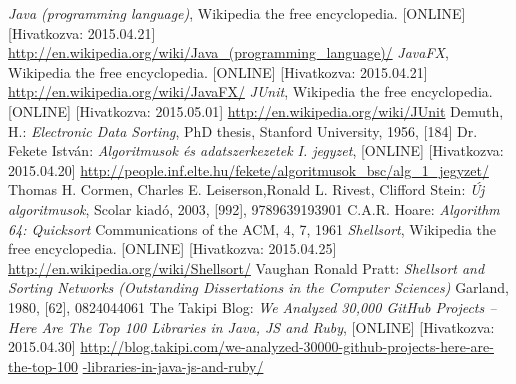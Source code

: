 \documentclass{elteikthesis}
\begin{document}
\begin{thebibliography}{widest entry}
\emph{Java (programming language)},
Wikipedia the free encyclopedia.
[ONLINE] [Hivatkozva: 2015.04.21]
\url{http://en.wikipedia.org/wiki/Java_(programming_language)/}
\emph{JavaFX},
Wikipedia the free encyclopedia.
[ONLINE] [Hivatkozva: 2015.04.21]
\url{http://en.wikipedia.org/wiki/JavaFX/}
\emph{JUnit},
Wikipedia the free encyclopedia.
[ONLINE] [Hivatkozva: 2015.05.01]
\url{http://en.wikipedia.org/wiki/JUnit}
Demuth, H.:
\emph{Electronic Data Sorting},
PhD thesis, Stanford University,
1956, [184]
Dr. Fekete István:
\emph{Algoritmusok és adatszerkezetek I. jegyzet},
[ONLINE] [Hivatkozva: 2015.04.20] \url{http://people.inf.elte.hu/fekete/algoritmusok_bsc/alg_1_jegyzet/}
Thomas H. Cormen, Charles E. Leiserson,Ronald L. Rivest, Clifford Stein:
\emph{Új algoritmusok},
Scolar kiadó, 2003,
[992], 9789639193901
C.A.R. Hoare:
\emph{Algorithm 64: Quicksort}
Communications of the ACM, 4, 7, 1961
\emph{Shellsort},
Wikipedia the free encyclopedia.
[ONLINE] [Hivatkozva: 2015.04.25]
\url{http://en.wikipedia.org/wiki/Shellsort/}
Vaughan Ronald Pratt:
\emph{Shellsort and Sorting Networks (Outstanding Dissertations in the Computer Sciences)}
Garland, 1980, [62], 0824044061 
The Takipi Blog:
\emph{We Analyzed 30,000 GitHub Projects – Here Are The Top 100 Libraries in Java, JS and Ruby},
[ONLINE] [Hivatkozva: 2015.04.30] \url{http://blog.takipi.com/we-analyzed-30000-github-projects-here-are-the-top-100}
\url{-libraries-in-java-js-and-ruby/}
\end{thebibliography}
\end{document}
